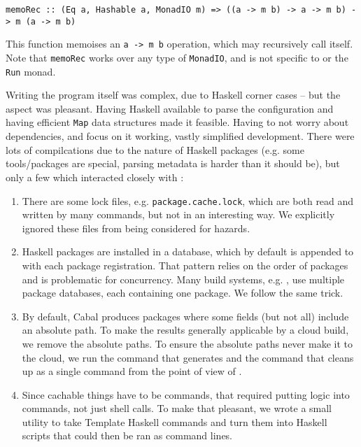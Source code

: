 \begin{verbatim}
memoRec :: (Eq a, Hashable a, MonadIO m) => ((a -> m b) -> a -> m b) -> m (a -> m b)
\end{verbatim}

This function memoises an \texttt{a -> m b} operation, which may recursively call itself. Note that \texttt{memoRec} works over any type of \texttt{MonadIO}, and is not specific to \Rattle or the \texttt{Run} monad.

Writing the program itself was complex, due to Haskell corner cases -- but the \Rattle aspect was pleasant. Having Haskell available to parse the configuration and having efficient \texttt{Map} data structures made it feasible. Having to not worry about dependencies, and focus on it working, vastly simplified development. There were lots of compilcations due to the nature of Haskell packages (e.g. some tools/packages are special, parsing metadata is harder than it should be), but only a few which interacted closely with \Rattle:

\begin{enumerate}
\item There are some lock files, e.g. \texttt{package.cache.lock}, which are both read and written by many commands, but not in an interesting way. We explicitly ignored these files from being considered for hazards.
\item Haskell packages are installed in a database, which by default is appended to with each package registration. That pattern relies on the order of packages and is problematic for concurrency. Many build systems, e.g. \Bazel, use multiple package databases, each containing one package. We follow the same trick.
\item By default, Cabal produces packages where some fields (but not all) include an absolute path. To make the results generally applicable by a cloud build, we remove the absolute paths. To ensure the absolute paths never make it to the cloud, we run the command that generates and the command that cleans up as a single command from the point of view of \Rattle.
\item Since cachable things have to be commands, that required putting logic into commands, not just shell calls. To make that pleasant, we wrote a small utility to take Template Haskell commands \cite{template_haskell} and turn them into Haskell scripts that could then be ran as command lines.
\end{enumerate}
